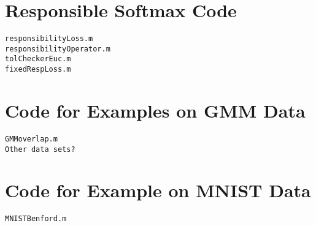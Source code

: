 




\chapter{Responsible Softmax Code}
\begin{verbatim}
responsibilityLoss.m 
responsibilityOperator.m
tolCheckerEuc.m
fixedRespLoss.m
\end{verbatim}

\chapter{Code for Examples on GMM Data}
\begin{verbatim}
GMMoverlap.m 
Other data sets?
\end{verbatim}

\chapter{Code for Example on MNIST Data}
\begin{verbatim}
MNISTBenford.m
\end{verbatim}
